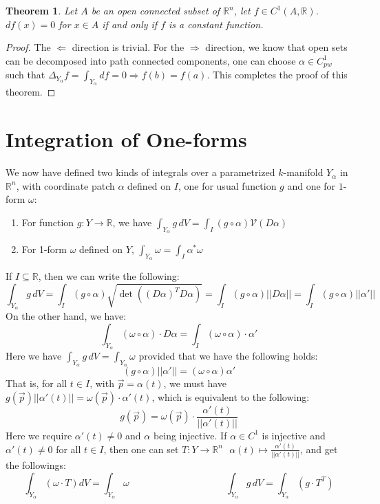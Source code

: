 \documentclass[11pt,oneside]{book}
\theoremstyle{break}
\theoremstyle{break}
\newtheorem{thm}{Theorem}[section]
\newcommand{\R}{\mathbb{R}}
\begin{document}
\begin{thm}
Let $A$ be an open connected subset of $\R^n$, let $f \in C^1(A,\R)$. $df(x) = 0$ for $x \in A$ if and only if $f$ is a constant function. 
\end{thm}
\begin{proof}
The $\Leftarrow$ direction is trivial. For the $\Rightarrow$ direction, we know that open sets can be decomposed into path connected components, one can choose $\alpha\in C^1_{pw}$ such that $\Delta_{Y_\alpha} f = \int_{Y_\alpha} df = 0 \Rightarrow f(b) = f(a)$. This completes the proof of this theorem.
\end{proof}

\newpage
\section[Integration of One-forms]{\color{red}Integration of One-forms \color{black}}
We now have defined two kinds of integrals over a parametrized $k$-manifold $Y_\alpha$ in $\R^n$, with coordinate patch $\alpha$ defined on $I$, one for usual function $g$ and one for $1$-form $\omega$:
\begin{enumerate}[topsep=3pt,itemsep=-1ex,partopsep=1ex,parsep=1ex]
\item For function $g:Y\to \R$, we have $\int_{Y_\alpha} g\, dV = \int_I (g\circ \alpha)\mathcal{V}(D\alpha)$
\item For 1-form $\omega$ defined on $Y$, $\int_{Y_\alpha} \omega = \int_{I} \alpha^*\omega$
\end{enumerate}
If $I \subseteq \R$, then we can write the following:
$$\int_{Y_{\alpha}} g\, dV = \int_I (g\circ \alpha) \sqrt{\det((D\alpha)^TD\alpha)} = \int_I (g\circ \alpha) ||D\alpha|| = \int_I (g\circ \alpha) ||\alpha'||$$
On the other hand, we have:
$$\int_{Y_\alpha} (\omega \circ \alpha) \cdot D\alpha= \int_I (\omega \circ \alpha) \cdot \alpha'$$
Here we have $\int_{Y_\alpha} g\, dV  = \int_{Y_\alpha} \omega$ provided that we have the following holds:
$$(g\circ \alpha)||\alpha'|| = (\omega \circ \alpha) \alpha'$$
That is, for all $t\in I$, with $\vec{p} = \alpha(t)$, we must have $g(\vec{p})||\alpha'(t)|| = \omega(\vec{p})\cdot \alpha'(t)$, which is equivalent to the following:
$$g(\vec{p}) = \omega(\vec{p}) \cdot \frac{\alpha'(t)}{||\alpha'(t)||}$$
Here we require $\alpha'(t) \neq 0$ and $\alpha$ being injective. If $\alpha\in C^1$ is injective and $\alpha'(t)\neq 0$ for all $t \in I$, then one can set $T:Y \to \R^n \ \ \ \alpha(t)\mapsto \frac{\alpha'(t)}{||\alpha'(t)||}$, and get the followings:
$$\int_{Y_{\alpha}} (\omega \cdot T)dV = \int_{Y_\alpha}\omega \qquad\qquad\qquad\qquad\qquad\int_{Y_{\alpha}} g\, dV = \int_{Y_\alpha} (g\cdot T^T)$$
\hfill\break
\end{document}
